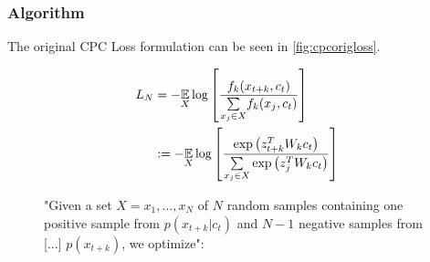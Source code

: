 \subsubsection{Algorithm}
The original CPC Loss formulation can be seen in \autoref{fig:cpcorigloss}.
\begin{tcolorbox}
	\begin{figure}[H]
		\centering
		\caption{"Given a set $X = {x_1, \ldots, x_N }$ of $N$ random samples containing one positive sample from $p(x_{t+k}|c_t)$ and $N - 1$ negative samples from [...] $p(x_{t+k})$, we optimize":}
		\begin{equation}
			\begin{aligned}
				L_N &=-\underset{X}{\operatorname{\mathbb{E}}}\log\left[\frac{f_k(x_{t+k}, c_t)}{\underset{x_j\in X}{\sum}f_k(x_{j}, c_t)}\right]\\
				&:=-\underset{X}{\operatorname{\mathbb{E}}}\log\left[\frac{\exp \left( z_{t+k}^T W_kc_t\right)}{\underset{x_j\in X}{\sum}\exp \left(z_{j}^TW_kc_t\right)}\right] \nonumber
			\end{aligned}
		\end{equation}	
		\label{fig:cpcorigloss}
	\end{figure}
\end{tcolorbox}

